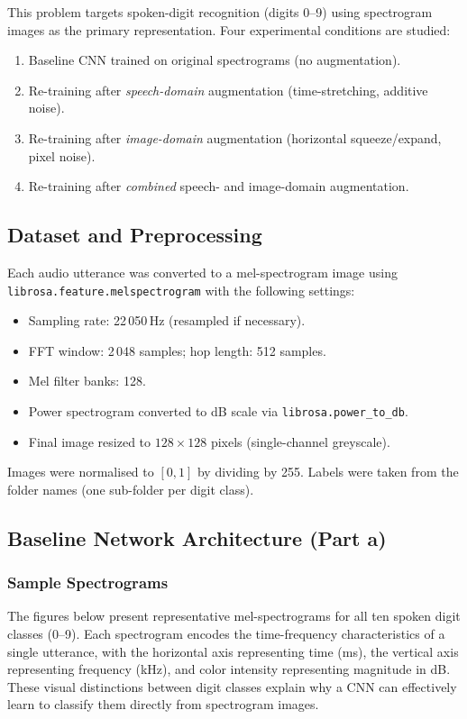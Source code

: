 \begingroup
\graphicspath{{../prob_3/Figures/}}


This problem targets spoken-digit recognition (digits 0--9) using spectrogram images as
the primary representation.  Four experimental conditions are studied:
\begin{enumerate}[label=\alph*)]
    \item Baseline CNN trained on original spectrograms (no augmentation).
    \item Re-training after \emph{speech-domain} augmentation (time-stretching, additive noise).
    \item Re-training after \emph{image-domain} augmentation (horizontal squeeze/expand, pixel noise).
    \item Re-training after \emph{combined} speech- and image-domain augmentation.
\end{enumerate}

\subsection{Dataset and Preprocessing}

Each audio utterance was converted to a mel-spectrogram image using
\texttt{librosa.feature.melspectrogram} with the following settings:
\begin{itemize}
    \item Sampling rate: 22\,050\,Hz (resampled if necessary).
    \item FFT window: 2\,048 samples; hop length: 512 samples.
    \item Mel filter banks: 128.
    \item Power spectrogram converted to dB scale via \texttt{librosa.power\_to\_db}.
    \item Final image resized to $128\times128$ pixels (single-channel greyscale).
\end{itemize}
Images were normalised to $[0,1]$ by dividing by 255.  Labels were taken from the
folder names (one sub-folder per digit class).

\subsection{Baseline Network Architecture (Part a)}

\subsubsection{Sample Spectrograms}
The figures below present representative mel-spectrograms for all ten spoken digit classes (0–9). Each spectrogram encodes the time-frequency characteristics of a single utterance, with the horizontal axis representing time (ms), the vertical axis representing frequency (kHz), and color intensity representing magnitude in dB.
These visual distinctions between digit classes explain why a CNN can effectively learn to classify them directly from spectrogram images.


